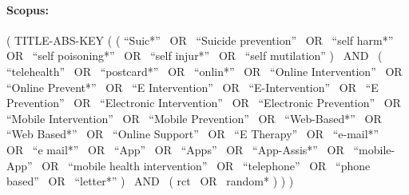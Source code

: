 \documentclass[
  english,
  man]{apa6}
\let\oldparagraph\paragraph
\renewcommand{\paragraph}[1]{\oldparagraph{#1}\mbox{}}
\begin{document}
\hypertarget{scopus}{%
\paragraph{Scopus:}\label{scopus}}

( TITLE-ABS-KEY ( ( ``Suic*''~ OR~ ``Suicide prevention''~ OR~ ``self harm*''~ OR~ ``self poisoning*''~ OR~ ``self injur*''~ OR~ ``self mutilation'' )~ AND~ ( ``telehealth''~ OR~ ``postcard*''~ OR~ ``onlin*''~ OR~ ``Online Intervention''~ OR~ ``Online Prevent*''~ OR~ ``E Intervention''~ OR~ ``E-Intervention''~ OR~ ``E Prevention''~ OR~ ``Electronic Intervention''~ OR~ ``Electronic Prevention''~ OR~ ``Mobile Intervention''~ OR~ ``Mobile Prevention''~ OR~ ``Web-Based*''~ OR~ ``Web Based*''~ OR~ ``Online Support''~ OR~ ``E Therapy''~ OR~ ``e-mail*''~ OR~ ``e mail*''~ OR~ ``App''~ OR~ ``Apps''~ OR~ ``App-Assis*''~ OR~ ``mobile-App''~ OR~ ``mobile health intervention''~ OR~ ``telephone''~ OR~ ``phone based''~ OR~ ``letter*'' )~ AND~ ( rct~ OR~ random* ) ) )
\end{document}

